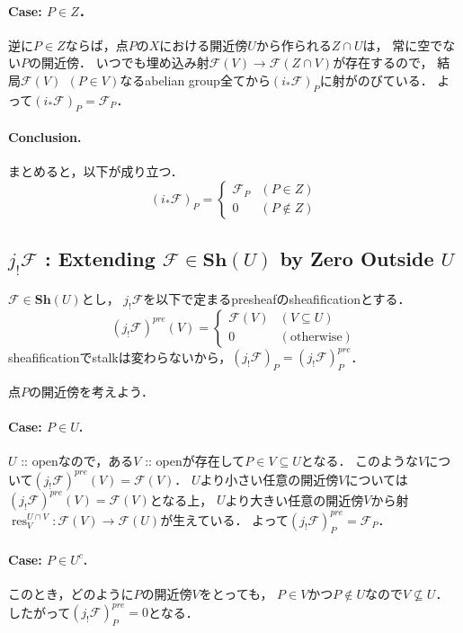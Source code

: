 \documentclass[a4paper]{jsarticle}
\newcommand{\shF}{\mathcal{F}}
\newcommand{\Sh}{\mathbf{Sh}}
\newcommand{\res}{\operatorname{res}}
\begin{document}
    \paragraph{Case: $P \in Z$．}
    逆に$P \in Z$ならば，点$P$の$X$における開近傍$U$から作られる$Z \cap U$は，
    常に空でない$P$の開近傍．
    いつでも埋め込み射$\shF(V) \to \shF(Z \cap V)$が存在するので，
    結局$\shF(V) ~~(P \in V)$なるabelian group全てから$(i_* \shF)_P$に射がのびている．
    よって$(i_* \shF)_P=\shF_P$．

    \paragraph{Conclusion.}
    まとめると，以下が成り立つ．
    \[
        (i_* \shF)_P=
        \begin{cases}{}
            \shF_P & (P \in Z) \\
            0 & (P \not \in Z)
        \end{cases}
    \]

    \subsection{$j_! \shF$ : Extending $\shF \in \Sh(U)$ by Zero Outside $U$}
    $\shF \in \Sh(U)$とし，
    $j_! \shF$を以下で定まるpresheafのsheafificationとする．
    \[
        (j_! \shF)^{pre}(V)=
        \begin{cases}{}
            \shF(V) & (V \subseteq U) \\
            0 & (\text{otherwise})
        \end{cases}
    \]
    sheafificationでstalkは変わらないから，$(j_! \shF)_P=(j_! \shF)^{pre}_P$．

    点$P$の開近傍を考えよう．

    \paragraph{Case: $P \in U$.}
    $U$ :: openなので，ある$V$ :: openが存在して$P \in V \subseteq U$となる．
    このような$V$について$(j_! \shF)^{pre}(V)=\shF(V)$．
    $U$より小さい任意の開近傍$V$については$(j_! \shF)^{pre}(V)=\shF(V)$となる上，
    $U$より大きい任意の開近傍$V$から射$\res_V^{U \cap V}: \shF(V) \to \shF(U)$が生えている．
    よって$(j_! \shF)^{pre}_P=\shF_P$．

    \paragraph{Case: $P \in U^c$.}
    このとき，どのように$P$の開近傍$V$をとっても，
    $P \in V$かつ$P \not \in U$なので$V \not \subseteq U$．
    したがって$(j_! \shF)^{pre}_P=0$となる．
\end{document}
